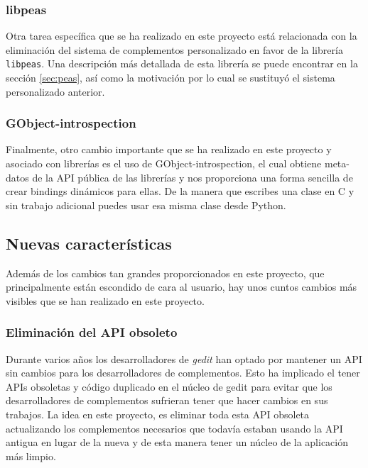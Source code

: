 \subsubsection{libpeas}

Otra tarea específica que se ha realizado en este proyecto está relacionada
con la eliminación del sistema de complementos personalizado en favor de la librería
\texttt{libpeas}. Una descripción más detallada de esta librería se puede
encontrar en la sección \ref{sec:peas}, así como la motivación por lo cual
se sustituyó el sistema personalizado anterior.

\subsubsection{GObject-introspection}

Finalmente, otro cambio importante que se ha realizado en este proyecto y
asociado con librerías es el uso de GObject-introspection, el cual obtiene
meta-datos de la API pública de las librerías y nos proporciona una forma
sencilla de crear bindings dinámicos para ellas. De la manera que escribes
una clase en C y sin trabajo adicional puedes usar esa misma clase desde Python.

\subsection{Nuevas características}

Además de los cambios tan grandes proporcionados en este proyecto, que principalmente
están escondido de cara al usuario, hay unos cuntos cambios más visibles que se
han realizado en este proyecto.

\subsubsection{Eliminación del API obsoleto}

Durante varios años los desarrolladores de \emph{gedit} han optado por mantener
un API sin cambios para los desarrolladores de complementos. Esto ha implicado
el tener APIs obsoletas y código duplicado en el núcleo de gedit para evitar
que los desarrolladores de complementos sufrieran tener que hacer cambios en
sus trabajos. La idea en este proyecto, es eliminar toda esta API obsoleta
actualizando los complementos necesarios que todavía estaban usando la API antigua
en lugar de la nueva y de esta manera tener un núcleo de la aplicación más
limpio.

